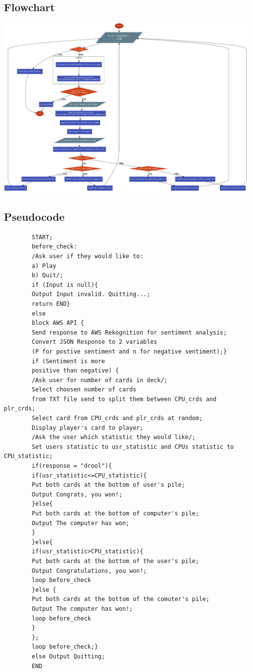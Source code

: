 \documentclass[a4paper]{article}
\begin{document}
	\subsection{Flowchart}
	\begin{center}
		\includegraphics[width=1\linewidth]{flowchart.png}
	\end{center}
	\pagebreak
	\subsection{Pseudocode}
	\begin{lstlisting}
		START;
		before_check:
		/Ask user if they would like to: 
		a) Play
		b) Quit/;
		if (Input is null){
		Output Input invalid. Quitting...;
		return END}
		else
		block AWS API {
		Send response to AWS Rekognition for sentiment analysis;
		Convert JSON Response to 2 variables 
		(P for postive sentiment and n for negative sentiment);}
		if (Sentiment is more 
		positive than negative) {
		/Ask user for number of cards in deck/;
		Select choosen number of cards 
		from TXT file send to split them between CPU_crds and plr_crds;
		Select card from CPU_crds and plr_crds at random;
		Display player's card to player;
		/Ask the user which statistic they would like/;
		Set users statistic to usr_statistic and CPUs statistic to CPU_statistic;
		if(response = "drool"){
		if(usr_statistic<=CPU_statistic){
		Put both cards at the bottom of user's pile;
		Output Congrats, you won!;
		}else{
		Put both cards at the bottom of computer's pile;
		Output The computer has won; 
		}
		}else{
		if(usr_statistic>CPU_statistic){
		Put both cards at the bottom of the user's pile;
		Output Congratulations, you won!;
		loop before_check
		}else {
		Put both cards at the bottom of the comuter's pile;
		Output The computer has won!;
		loop before_check
		}
		};
		loop before_check;}
		else Output Quitting;
		END
	\end{lstlisting}
	\pagebreak
\end{document}
